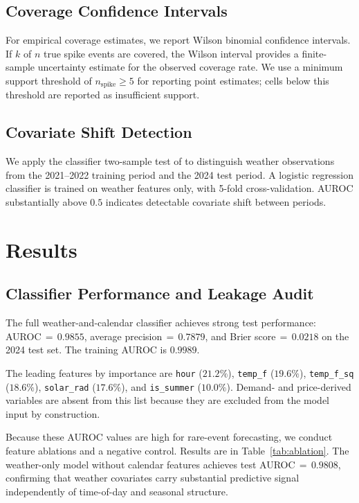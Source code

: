 \documentclass{article}
\begin{document}
\subsection{Coverage Confidence Intervals}

For empirical coverage estimates, we report Wilson binomial confidence
intervals. If $k$ of $n$ true spike events are covered, the Wilson interval
provides a finite-sample uncertainty estimate for the observed coverage rate.
We use a minimum support threshold of $n_{\mathrm{spike}} \geq 5$ for
reporting point estimates; cells below this threshold are reported as
insufficient support.

\subsection{Covariate Shift Detection}

We apply the classifier two-sample test of \citet{lopezpaz2017} to distinguish
weather observations from the 2021--2022 training period and the 2024 test
period. A logistic regression classifier is trained on weather features only,
with 5-fold cross-validation. AUROC substantially above $0.5$ indicates
detectable covariate shift between periods.

\section{Results}
\label{sec:results}

\subsection{Classifier Performance and Leakage Audit}

The full weather-and-calendar classifier achieves strong test performance:
AUROC\,${=}\,0.9855$, average precision\,${=}\,0.7879$, and Brier
score\,${=}\,0.0218$ on the 2024 test set. The training AUROC is $0.9989$.

The leading features by importance are \texttt{hour} ($21.2\%$),
\texttt{temp\_f} ($19.6\%$), \texttt{temp\_f\_sq} ($18.6\%$),
\texttt{solar\_rad} ($17.6\%$), and \texttt{is\_summer} ($10.0\%$). Demand-
and price-derived variables are absent from this list because they are
excluded from the model input by construction.

Because these AUROC values are high for rare-event forecasting, we conduct
feature ablations and a negative control. Results are in
Table~\ref{tab:ablation}. The weather-only model without calendar features
achieves test AUROC\,${=}\,0.9808$, confirming that weather covariates carry
substantial predictive signal independently of time-of-day and seasonal
structure.
\end{document}
